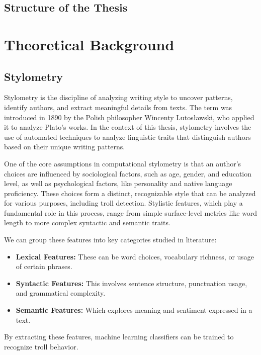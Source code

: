 \documentclass[twoside]{ctuthesis}
\theoremstyle{plain}
\theoremstyle{definition}
\theoremstyle{note}
\begin{document}
\section{Structure of the Thesis}

\chapter{Theoretical Background}
\label{chap:theory}

\section{Stylometry}
Stylometry is the discipline of analyzing writing style to uncover patterns, identify authors, and extract meaningful details from texts.\cite{Mosteller1964Federalist}\cite{Pascucci2020Misogyny} The term was introduced in 1890 by the Polish philosopher Wincenty Lutosławski, who applied it to analyze Plato's works.\cite{Lutoslawski1898} In the context of this thesis,  stylometry involves the use of automated techniques to analyze linguistic traits that distinguish authors based on their unique writing patterns.\par
One of the core assumptions in computational stylometry is that an author’s choices are influenced by sociological factors, such as age, gender, and education level, as well as psychological factors, like personality and native language proficiency.\cite{Daelemans2013Explanation} These choices form a distinct, recognizable style that can be analyzed for various purposes, including troll detection. Stylistic features, which play a fundamental role in this process, range from simple surface-level metrics like word length to more complex syntactic and semantic traits.\par
We can group these features into key categories studied in literature:
\begin{itemize}
    \item \textbf{Lexical Features:} These can be word choices, vocabulary richness, or usage of certain phrases.
    \item \textbf{Syntactic Features:} This involves sentence structure, punctuation usage, and grammatical complexity.\cite{Sari2018Features}
    \item \textbf{Semantic Features:} Which explores meaning and sentiment expressed in a text.\cite{Jiang2021Sentiment}
\end{itemize}
By extracting these features, machine learning classifiers can be trained to recognize troll behavior.
\end{document}
